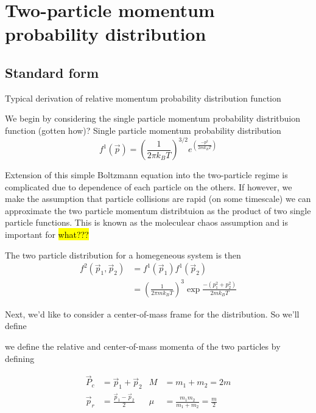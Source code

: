 \chapter{Two-particle momentum probability distribution}
\label{ch:momDistDer}

\section{Standard form}
\label{sec:standardDist}

Typical derivation of relative momentum probability distribution function

We begin by considering the single particle momentum probability distritbuion function (gotten how)? 
Single particle momentum probability distribution
\begin{equation} 
\label{eq:single_particle_prob}
		 f^1( \vec{p} ) = \left(\frac{1}{2 \pi k_B T}\right)^{3/2} e^{\left(\frac{-p^2}{2 m k_B T}\right)}
\end{equation}

\noindent
Extension of this simple Boltzmann equation into the two-particle regime is complicated due to dependence of each particle on the others. If however, we make the assumption that particle collisions are rapid (on some timescale) we can approximate the two particle momentum distribtuion as the product of two single particle functions. This is known as the moleculear chaos assumption and is important for \hl{what???}

The two particle distribution for a homegeneous system is then
\begin{equation}
\label{eq:two_particle_prob}
\begin{split}
		 f^2( \vec{p}_1, \vec{p}_2 ) &= f^1( \vec{p}_1 ) f^1( \vec{p}_2 ) \\
		  &= \left(\frac{1}{2 \pi m k_B T}\right)^3 \exp{\frac{-(p_1^2 + p_2^2)}{2 m k_B T}}
\end{split}
\end{equation}

Next, we'd like to consider a center-of-mass frame for the distribution. So we'll define

 we define the relative and center-of-mass momenta of the two particles by defining

\begin{align*}
	\vec{P}_c & = \vec{p}_1 + \vec{p}_2             &	M   &= m_1 + m_2 = 2m \\
	\vec{p}_r & = \frac{\vec{p}_1 - \vec{p}_2}{2}   &   \mu &= \frac{m_1 m_2}{m_1 + m_2} = \frac{m}{2}
\end{align*}

